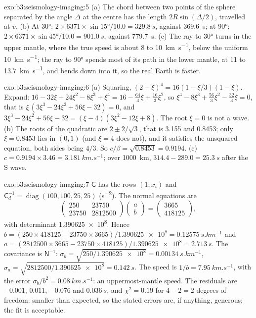 \begin{solution}{exo:b3:seismology-imaging:5}
(a) The chord between two points of the sphere separated by the angle $\Delta$
at the centre has the length $2R\sin(\Delta/2)$, travelled at $v$.
(b) At \ang{30}: $2\times6371\times\sin\ang{15}/10.0 = \qty{329.8}{s}$, against
\qty{369.6}{s}; at \ang{90}: $2\times6371\times\sin\ang{45}/10.0 =
\qty{901.0}{s}$, against \qty{779.7}{s}. (c) The ray to \ang{30} turns in the
upper mantle, where the true speed is about 8 to \qty{10}{km.s^{-1}}, below the
uniform \qty{10}{km.s^{-1}}; the ray to \ang{90} spends most of its path in the
lower mantle, at 11 to \qty{13.7}{km.s^{-1}}, and bends down into it, so the
real Earth is faster.
\end{solution}

\begin{solution}{exo:b3:seismology-imaging:6}
(a) Squaring, $(2 - \xi)^4 = 16(1 - \xi/3)(1 - \xi)$. Expand:
$16 - 32\xi + 24\xi^2 - 8\xi^3 + \xi^4 = 16 - \tfrac{64}{3}\xi + \tfrac{16}{3}\xi^2$,
so $\xi^4 - 8\xi^3 + \tfrac{56}{3}\xi^2 - \tfrac{32}{3}\xi = 0$, that is
$\xi\,(3\xi^3 - 24\xi^2 + 56\xi - 32) = 0$, and
$3\xi^3 - 24\xi^2 + 56\xi - 32 = (\xi - 4)(3\xi^2 - 12\xi + 8)$. The root
$\xi = 0$ is not a wave. (b) The roots of the quadratic are $2 \pm 2/\sqrt3$,
that is 3.155 and 0.8453; only $\xi = 0.8453$ lies in $(0, 1)$ (and $\xi = 4$
does not), and it satisfies the unsquared equation, both sides being $4/3$.
So $c/\beta = \sqrt{0.8453} = 0.9194$. (c) $c = 0.9194\times3.46 =
\qty{3.181}{km.s^{-1}}$; over \qty{1000}{km}, $314.4 - 289.0 = \qty{25.3}{s}$
after the S wave.
\end{solution}

\begin{solution}{exo:b3:seismology-imaging:7}
$\mathsf G$ has the rows $(1, x_i)$ and $\mathsf C_d^{-1} = \operatorname{diag}
(100, 100, 25, 25)$ (\unit{s^{-2}}). The normal equations are
\[
  \begin{pmatrix} 250 & 23750 \\ 23750 & \num{2812500} \end{pmatrix}
  \begin{pmatrix} a \\ b \end{pmatrix}
  = \begin{pmatrix} 3665 \\ 418125 \end{pmatrix},
\]
with determinant \num{1.390625e8}. Hence $b = (250\times418125 -
23750\times3665)/\num{1.390625e8} = \qty{0.12575}{s.km^{-1}}$ and
$a = (2812500\times3665 - 23750\times418125)/\num{1.390625e8} =
\qty{2.713}{s}$. The covariance is $\mathsf N^{-1}$: $\sigma_b =
\sqrt{250/\num{1.390625e8}} = \qty{0.00134}{s.km^{-1}}$, $\sigma_a =
\sqrt{2812500/\num{1.390625e8}} = \qty{0.142}{s}$. The speed is
$1/b = \qty{7.95}{km.s^{-1}}$, with the error $\sigma_b/b^2 =
\qty{0.08}{km.s^{-1}}$: an uppermost-mantle speed. The residuals are $-0.001$,
$0.011$, $-0.076$ and $\qty{0.036}{s}$, and $\chi^2 = 0.19$ for $4 - 2 = 2$
degrees of freedom: smaller than expected, so the stated errors are, if
anything, generous; the fit is acceptable.
\end{solution}

